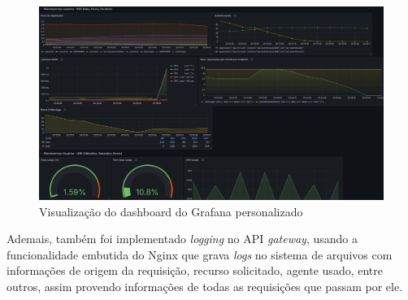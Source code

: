 \begin{figure}[htb]
	\caption{\label{figura-dashboard}Visualização do dashboard do Grafana personalizado}
	\begin{center}
	    \includegraphics[scale=0.4]{Imagens/dashboard.png}
	\end{center}
\end{figure}

Ademais, também foi implementado \emph{logging} no API \emph{gateway}, usando a funcionalidade embutida do Nginx que grava \emph{logs} no sistema de arquivos com informações de origem da requisição, recurso solicitado, agente usado, entre outros, assim provendo informações de todas as requisições que passam por ele.


